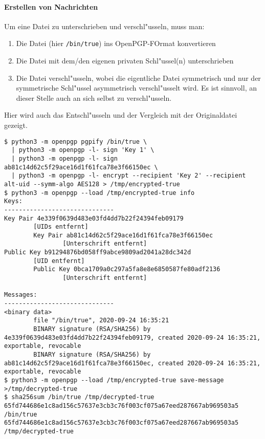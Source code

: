 \documentclass[12pt]{article}
\begin{document}
\paragraph{Erstellen von Nachrichten}
Um eine Datei zu unterschrieben und verschl"usseln, muss man:
\begin{enumerate}
    \item Die Datei (hier \texttt{/bin/true}) ins OpenPGP-FOrmat konvertieren
    \item Die Datei mit dem/den eigenen privaten Schl"ussel(n) unterschrieben
    \item Die Datei verschl"usseln, wobei die eigentliche Datei symmetrisch
        und nur der symmetrische Schl"ussel asymmetrisch verschl"usselt wird.
        Es ist sinnvoll, an dieser Stelle auch an sich selbst zu verschl"usseln.
\end{enumerate}
Hier wird auch das Entschl"usseln und der Vergleich mit der Originaldatei gezeigt.
\begin{lstlisting}
$ python3 -m openpgp pgpify /bin/true \
  | python3 -m openpgp -l- sign 'Key 1' \
  | python3 -m openpgp -l- sign ab81c14d62c5f29ace16d1f61fca78e3f66150ec \
  | python3 -m openpgp -l- encrypt --recipient 'Key 2' --recipient alt-uid --symm-algo AES128 > /tmp/encrypted-true
$ python3 -m openpgp --load /tmp/encrypted-true info
Keys:
------------------------------
Key Pair 4e339f0639d483e03fd4dd7b22f24394feb09179
        [UIDs entfernt]
        Key Pair ab81c14d62c5f29ace16d1f61fca78e3f66150ec
                [Unterschrift entfernt]
Public Key b91294876bd058ff9abce9809ad2041a28dc342d
        [UID entfernt]
        Public Key 0bca1709a0c297a5fa8e8e6850587fe80adf2136
                [Unterschrift entfernt]

Messages:
------------------------------
<binary data>
        file "/bin/true", 2020-09-24 16:35:21
        BINARY signature (RSA/SHA256) by 4e339f0639d483e03fd4dd7b22f24394feb09179, created 2020-09-24 16:35:21, exportable, revocable
        BINARY signature (RSA/SHA256) by ab81c14d62c5f29ace16d1f61fca78e3f66150ec, created 2020-09-24 16:35:21, exportable, revocable
$ python3 -m openpgp --load /tmp/encrypted-true save-message >/tmp/decrypted-true
$ sha256sum /bin/true /tmp/decrypted-true
65fd744686e1c8ad156c57637e3cb3c76f003cf075a67eed287667ab969503a5  /bin/true
65fd744686e1c8ad156c57637e3cb3c76f003cf075a67eed287667ab969503a5  /tmp/decrypted-true
\end{lstlisting}
\end{document}
